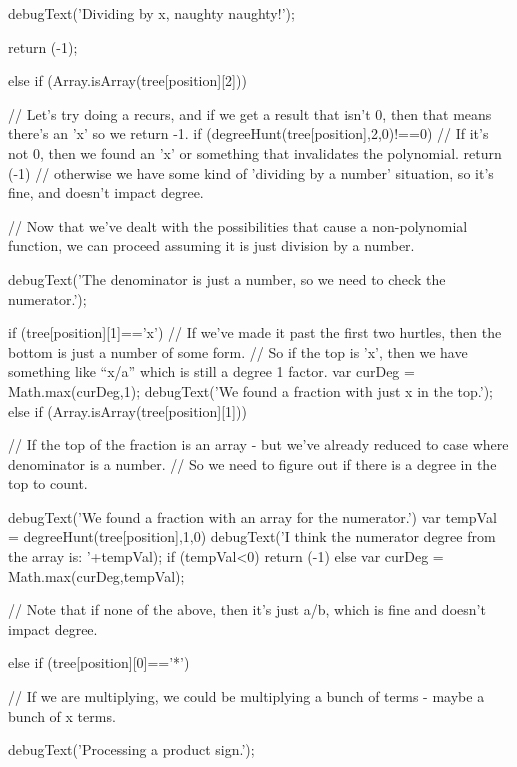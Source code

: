 \documentclass{ximera}
\begin{document}
\begin{javascript}
{{{            debugText('Dividing by x, naughty naughty!');
             
            return (-1);
        } else if (Array.isArray(tree[position][2])) {
            //  Let's try doing a recurs, and if we get a result that isn't 0, then that means there's an 'x' so we return -1.
            if (degreeHunt(tree[position],2,0)!==0) {
                // If it's not 0, then we found an 'x' or something that invalidates the polynomial.
                return (-1)
            } // otherwise we have some kind of 'dividing by a number' situation, so it's fine, and doesn't impact degree.
             
        }
         
        // Now that we've dealt with the possibilities that cause a non-polynomial function, we can proceed assuming it is just division by a number.
         
        debugText('The denominator is just a number, so we need to check the numerator.');
         
        if (tree[position][1]=='x') {
            // If we've made it past the first two hurtles, then the bottom is just a number of some form.
            //  So if the top is 'x', then we have something like ``x/a'' which is still a degree 1 factor.
            var curDeg = Math.max(curDeg,1);
            debugText('We found a fraction with just x in the top.');
        } else if (Array.isArray(tree[position][1])) {
            // If the top of the fraction is an array - but we've already reduced to case where denominator is a number.
            //  So we need to figure out if there is a degree in the top to count.
             
            debugText('We found a fraction with an array for the numerator.')
            var tempVal = degreeHunt(tree[position],1,0)
            debugText('I think the numerator degree from the array is: '+tempVal);
            if (tempVal<0) { return (-1)} else {
                 var curDeg = Math.max(curDeg,tempVal);
            }
             
        }// Note that if none of the above, then it's just a/b, which is fine and doesn't impact degree.
 
    } else if (tree[position][0]=='*') {
        // If we are multiplying, we could be multiplying a bunch of terms - maybe a bunch of x terms.
         
        debugText('Processing a product sign.');
         
}}
\end{javascript}
\end{document}
